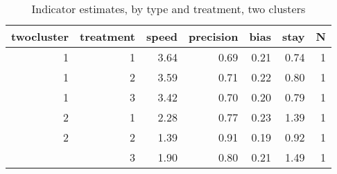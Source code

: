 \begin{table}

\caption{\label{tab:}Indicator estimates, by type and treatment, two clusters}
\centering
\begin{tabular}[t]{rrrrrrr}
\toprule
twocluster & treatment & speed & precision & bias & stay & N\\
\midrule
1 & 1 & 3.64 & 0.69 & 0.21 & 0.74 & 1\\
1 & 2 & 3.59 & 0.71 & 0.22 & 0.80 & 1\\
1 & 3 & 3.42 & 0.70 & 0.20 & 0.79 & 1\\
2 & 1 & 2.28 & 0.77 & 0.23 & 1.39 & 1\\
2 & 2 & 1.39 & 0.91 & 0.19 & 0.92 & 1\\
\addlinespace
2 & 3 & 1.90 & 0.80 & 0.21 & 1.49 & 1\\
\bottomrule
\end{tabular}
\end{table}
